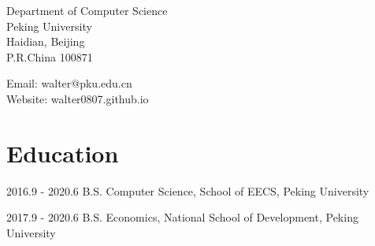 \documentclass{academiccv}
\begin{document}
\raggedright


\vspace{1em}
\begin{minipage}[t]{0.495\textwidth}
  Department of Computer Science \\
 Peking University\\
  Haidian, Beijing\\
  P.R.China 100871
\end{minipage}
\begin{minipage}[t]{0.495\textwidth}
  Email: walter@pku.edu.cn \\
  Website: walter0807.github.io \\
\end{minipage}
\vspace{0.5em}


\section*{Education}

\begin{tablist}

\item[2016.9 - 2020.6]  \tab B.S. Computer Science, School of EECS, Peking University
\item[2017.9 - 2020.6]  \tab B.S. Economics, National School of Development, Peking University

\end{tablist}
\end{document}
